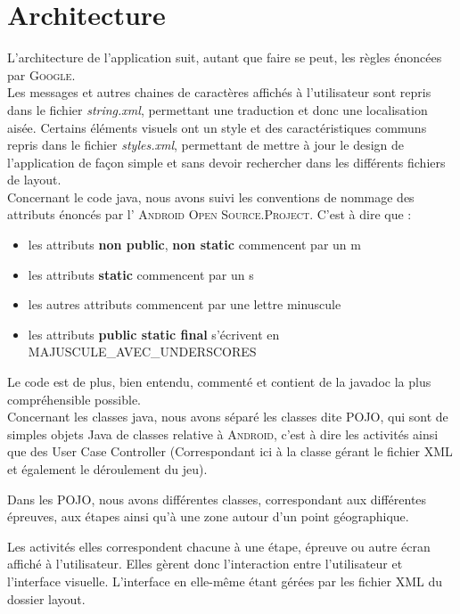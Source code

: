 \documentclass[11pt]{scrreprt}
\begin{document}
    \chapter{Architecture}
    L'architecture de l'application suit, autant que faire se peut, les règles énoncées par \textsc{Google}.\\

    Les messages et autres chaines de caractères affichés à l'utilisateur sont repris dans le fichier \textit{string.xml}, permettant une traduction et donc une localisation aisée. Certains éléments visuels ont un style et des caractéristiques communs repris dans le fichier \textit{styles.xml}, permettant de mettre à jour le design de l'application de façon simple et sans devoir rechercher dans les différents fichiers de layout.\\

    Concernant le code java, nous avons suivi les conventions de nommage des attributs énoncés par l' \textsc{Android Open Source.Project}. C'est à dire que :
    \begin{itemize}
        \item les attributs \textbf{non public}, \textbf{non static} commencent par un m
        \item les attributs \textbf{static} commencent par un s
        \item les autres attributs commencent par une lettre minuscule
        \item les attributs \textbf{public static final} s'écrivent en MAJUSCULE\_AVEC\_UNDERSCORES
    \end{itemize}

    Le code est de plus, bien entendu, commenté et contient de la javadoc la plus compréhensible possible.\\

    Concernant les classes java, nous avons séparé les classes dite \og POJO\fg, qui sont de simples objets Java de classes relative à \textsc{Android}, c'est à dire les activités ainsi que des \og User Case Controller\fg{} (Correspondant ici à la classe gérant le fichier XML et également le déroulement du jeu).

    Dans les POJO, nous avons différentes classes, correspondant aux différentes épreuves, aux étapes ainsi qu'à une zone autour d'un point géographique.

    Les activités elles correspondent chacune à une étape, épreuve ou autre écran affiché à l'utilisateur. Elles gèrent donc l'interaction entre l'utilisateur et l'interface visuelle. L'interface en elle-même étant gérées par les fichier XML du dossier layout.
\end{document}
